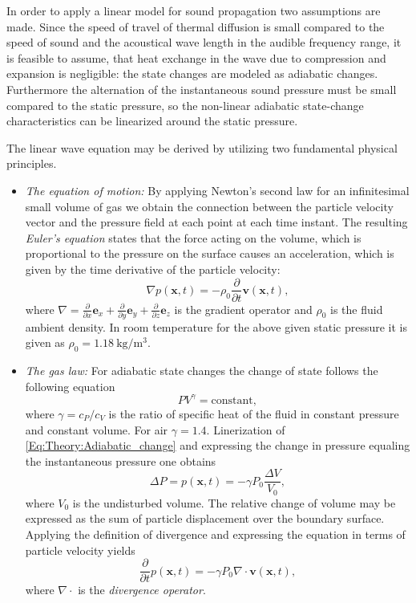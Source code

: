 In order to apply a linear model for sound propagation two assumptions are made.
Since the speed of travel of thermal diffusion is small compared to the speed of sound and the acoustical wave length in the audible frequency range, it is feasible to assume, that heat exchange in the wave due to compression and expansion is negligible: the state changes are modeled as adiabatic changes.
Furthermore the alternation of the instantaneous sound pressure must be small compared to the static pressure, so the non-linear adiabatic state-change characteristics can be linearized around the static pressure. 
%

The linear wave equation may be derived by utilizing two fundamental physical principles.
\begin{itemize}
\item \emph{The equation of motion:} By applying Newton's second law for an infinitesimal small volume of gas we obtain the connection between the particle velocity vector and the pressure field at each point at each time instant. The resulting \emph{Euler's equation} states that the force acting on the volume, which is proportional to the pressure on the surface causes an acceleration, which is given by the time derivative of the particle velocity:
\begin{equation}
\nabla p(\mathbf{x},t) = -\rho_0 \frac{\partial}{\partial t} \mathbf{v}(\mathbf{x},t),
\label{Eq:Theory:Eulers_equation}
\end{equation}
%
%
where $\nabla = \frac{\partial}{\partial x} \mathbf{e}_x + \frac{\partial}{\partial y} \mathbf{e}_y + \frac{\partial}{\partial z} \mathbf{e}_z$ is the gradient operator and $\rho_0$ is the fluid ambient density. In room temperature for the above given static pressure it is given as $\rho_0 = 1.18~\mathrm{kg}/\mathrm{m}^3$.
\item \emph{The gas law:} For adiabatic state changes the change of state follows the following equation
\begin{equation}
P V^{\gamma} = \mathrm{constant},
\label{Eq:Theory:Adiabatic_change}
\end{equation}
where $\gamma = c_P/c_V$ is the ratio of specific heat of the fluid in constant pressure and constant volume. For air $\gamma = 1.4$. Linerization of \eqref{Eq:Theory:Adiabatic_change} and expressing the change in pressure equaling the instantaneous pressure one obtains
\begin{equation}
\Delta P = p(\mathbf{x},t) = -\gamma P_0 \frac{\Delta V}{V_0},
\end{equation}
where $V_0$ is the undisturbed volume. The relative change of volume may be expressed as the sum of particle displacement over the boundary surface. Applying the definition of divergence and expressing the equation in terms of particle velocity yields
\begin{equation}
\frac{\partial}{\partial t} p(\mathbf{x},t) = -\gamma P_0 \nabla \cdot \mathbf{v}(\mathbf{x},t),
\label{Eq:Theory:Second_eq}
\end{equation}
where $\nabla \cdot$ is the \emph{divergence operator}.
\end{itemize}
